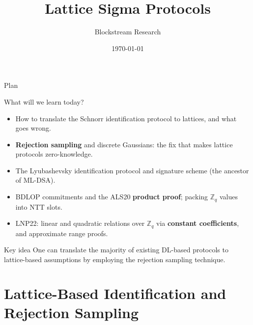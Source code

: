 \documentclass{zkdl-presentation-template}
\title[Lattice Sigma Protocols]{\textbf{Lattice Sigma Protocols}}
\author{Blockstream Research}
\date{\today}
\begin{document}
    \maketitleframe

    \begin{frame}{Plan}
      \tableofcontents[hideallsubsections]
    \end{frame}

    \begin{frame}{What will we learn today?}
        \begin{itemize}
            \item How to translate the Schnorr identification protocol to lattices, and what goes wrong.\pause
            \item \textbf{Rejection sampling} and discrete Gaussians: the fix that makes lattice protocols zero-knowledge.\pause
            \item The Lyubashevsky identification protocol and signature scheme (the ancestor of ML-DSA).\pause
            \item BDLOP commitments and the ALS20 \textbf{product proof}; packing $\mathbb{Z}_q$ values into NTT slots.\pause
            \item LNP22: linear and quadratic relations over $\mathbb{Z}_q$ via \textbf{constant coefficients}, and approximate range proofs.
        \end{itemize}
        \pause

        \begin{remarkblock}{Key idea}
            One can translate the majority of existing DL-based protocols to lattice-based assumptions by employing the rejection sampling technique.
        \end{remarkblock}
    \end{frame}

    \section[Identification and Rejection Sampling]{Lattice-Based Identification and Rejection Sampling}
\end{document}
